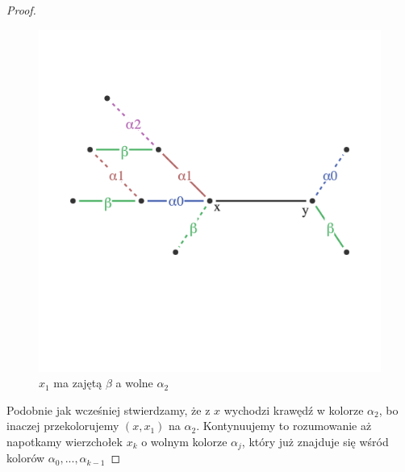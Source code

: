 \begin{proof}
        \begin{figure}[ht]
            \centering
            \includegraphics[scale=0.6]{chapters/dyskretna/colours/vizing/images/step_two.png}
            \caption{$x_1$ ma zajętą $\beta$ a wolne $\alpha_2$}
        \end{figure}
        
        Podobnie jak wcześniej stwierdzamy, że z $x$ wychodzi krawędź w kolorze $\alpha_2$, bo inaczej przekolorujemy $(x, x_1)$ na $\alpha_2$. Kontynuujemy to rozumowanie aż napotkamy wierzchołek $x_k$ o wolnym kolorze $\alpha_j$, który już znajduje się wśród kolorów $\alpha_0, ..., \alpha_{k-1}$
        

\end{proof}
